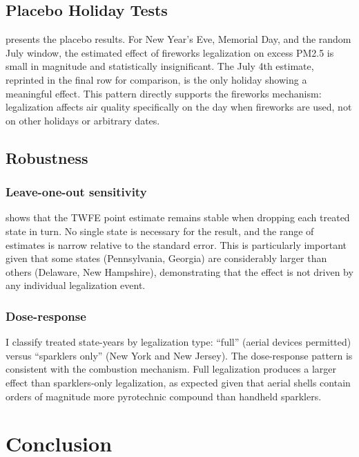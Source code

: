 \documentclass[12pt]{article}
\begin{document}
\subsection{Placebo Holiday Tests}



 presents the placebo results. For New Year's Eve, Memorial Day, and the random July window, the estimated effect of fireworks legalization on excess PM2.5 is small in magnitude and statistically insignificant. The July 4th estimate, reprinted in the final row for comparison, is the only holiday showing a meaningful effect. This pattern directly supports the fireworks mechanism: legalization affects air quality specifically on the day when fireworks are used, not on other holidays or arbitrary dates.

\subsection{Robustness}

\subsubsection*{Leave-one-out sensitivity}  shows that the TWFE point estimate remains stable when dropping each treated state in turn. No single state is necessary for the result, and the range of estimates is narrow relative to the standard error. This is particularly important given that some states (Pennsylvania, Georgia) are considerably larger than others (Delaware, New Hampshire), demonstrating that the effect is not driven by any individual legalization event.



\subsubsection*{Dose-response} I classify treated state-years by legalization type: ``full'' (aerial devices permitted) versus ``sparklers only'' (New York and New Jersey). The dose-response pattern is consistent with the combustion mechanism. Full legalization produces a larger effect than sparklers-only legalization, as expected given that aerial shells contain orders of magnitude more pyrotechnic compound than handheld sparklers.


\section{Conclusion}
\end{document}
